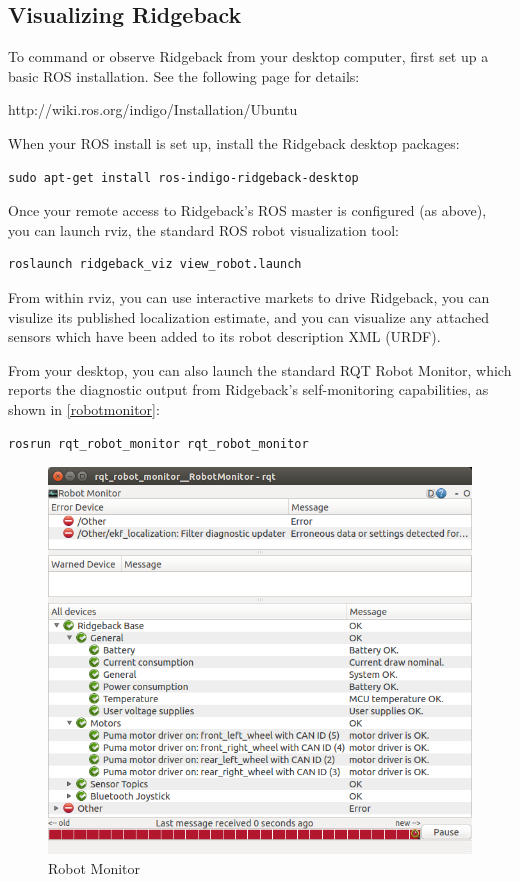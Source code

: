 \documentclass[]{clearpath-latex/clearpath-manual}
\begin{document}
\subsection{Visualizing Ridgeback}

To command or observe Ridgeback from your desktop computer, first set up a basic ROS installation.  See the following page for details:

http://wiki.ros.org/indigo/Installation/Ubuntu

When your ROS install is set up, install the Ridgeback desktop packages:

\begin{lstlisting}
sudo apt-get install ros-indigo-ridgeback-desktop
\end{lstlisting}

Once your remote access to Ridgeback's ROS master is configured (as above), you can launch rviz, the standard ROS robot visualization tool:

\begin{lstlisting}
roslaunch ridgeback_viz view_robot.launch
\end{lstlisting}

From within rviz, you can use interactive markets to drive Ridgeback, you can visulize its published localization estimate, and you can visualize any attached sensors which have been added to its robot description XML (URDF).

\pagebreak[4]

From your desktop, you can also launch the standard RQT Robot Monitor, which reports the diagnostic output from Ridgeback's self-monitoring capabilities, as shown in \autoref{robotmonitor}:

\begin{lstlisting}
rosrun rqt_robot_monitor rqt_robot_monitor
\end{lstlisting}

\begin{figure}[!htb]
  \centering
  \includegraphics[width=0.75\linewidth]{rqt_robot_monitor.png}
  \caption{Robot Monitor}
  \label{robotmonitor}
\end{figure}
\end{document}

